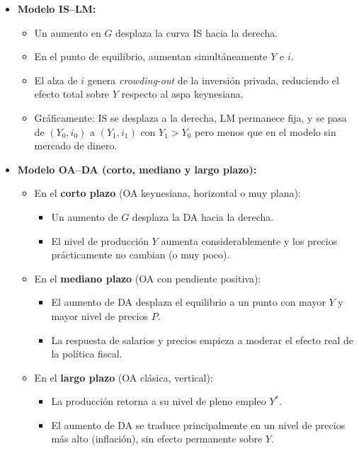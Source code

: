 \documentclass[11pt,addpoints]{article}
\begin{document}
\begin{enumerate}
\begin{enumerate}[label=\alph*)]
\begin{itemize}
\item \textbf{Modelo IS–LM:}
  \begin{itemize}
    \item Un aumento en $G$ desplaza la curva IS hacia la derecha.
    \item En el punto de equilibrio, aumentan simultáneamente $Y$ e $i$.
    \item El alza de $i$ genera \emph{crowding-out} de la inversión privada, reduciendo el efecto total sobre $Y$ respecto al aspa keynesiana.


\newpage
\vspace*{0.5cm}

    \item Gráficamente: IS se desplaza a la derecha, LM permanece fija, y se pasa de $(Y_0,i_0)$ a $(Y_1,i_1)$ con $Y_1>Y_0$ pero menos que en el modelo sin mercado de dinero.
  \end{itemize}

\item \textbf{Modelo OA–DA (corto, mediano y largo plazo):}
  \begin{itemize}
    \item En el \textbf{corto plazo} (OA keynesiana, horizontal o muy plana):
      \begin{itemize}
        \item Un aumento de $G$ desplaza la DA hacia la derecha.
        \item El nivel de producción $Y$ aumenta considerablemente y los precios prácticamente no cambian (o muy poco).
      \end{itemize}
    \item En el \textbf{mediano plazo} (OA con pendiente positiva):
      \begin{itemize}
        \item El aumento de DA desplaza el equilibrio a un punto con mayor $Y$ y mayor nivel de precios $P$.
        \item La respuesta de salarios y precios empieza a moderar el efecto real de la política fiscal.
      \end{itemize}
    \item En el \textbf{largo plazo} (OA clásica, vertical):
      \begin{itemize}
        \item La producción retorna a su nivel de pleno empleo $Y^*$.
        \item El aumento de DA se traduce principalmente en un nivel de precios más alto (inflación), sin efecto permanente sobre $Y$.
      \end{itemize}
  \end{itemize}


\end{itemize}
\end{enumerate}
\end{enumerate}
\end{document}
